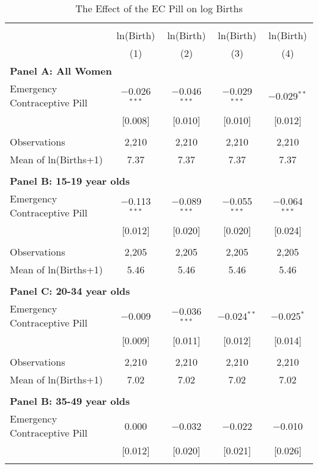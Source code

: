 \begin{table}[!htbp] \centering
\caption{The Effect of the EC Pill on log Births}
\label{TEENtab:aggregateLog}
\begin{tabular}{@{\extracolsep{5pt}}lcccc}
\\[-1.8ex]\hline \hline \\[-1.8ex] 
& ln(Birth) & ln(Birth) & ln(Birth) & ln(Birth) \\
&(1)&(2)&(3)&(4) \\ \hline
\multicolumn{5}{l}{\textbf{
\noindent Panel A: All Women}} \\
Emergency Contraceptive Pill&$-$0.026$^{***}$&$-$0.046$^{***}$&$-$0.029$^{***}$&$-$0.029$^{**}$\\
            &[0.008]&[0.010]&[0.010]&[0.012]\\
 & & & & \\
Observations&2,210&2,210&2,210&2,210\\
Mean of ln(Births+1) &7.37&7.37&7.37&7.37\\
 & & & & \\
\multicolumn{5}{l}{\noindent \textbf{
Panel B: 15-19 year olds}} \\
Emergency Contraceptive Pill&$-$0.113$^{***}$&$-$0.089$^{***}$&$-$0.055$^{***}$&$-$0.064$^{***}$\\
            &[0.012]&[0.020]&[0.020]&[0.024]\\
 & & & & \\
Observations&2,205&2,205&2,205&2,205\\
Mean of ln(Births+1) &5.46&5.46&5.46&5.46\\
 & & & & \\
\multicolumn{5}{l}{\noindent \textbf{
Panel C: 20-34 year olds}} \\
Emergency Contraceptive Pill&$-$0.009&$-$0.036$^{***}$&$-$0.024$^{**}$&$-$0.025$^{*}$\\
            &[0.009]&[0.011]&[0.012]&[0.014]\\
 & & & & \\
Observations&2,210&2,210&2,210&2,210\\
Mean of ln(Births+1) &7.02&7.02&7.02&7.02\\
 & & & & \\
\multicolumn{5}{l}{\noindent \textbf{
Panel B: 35-49 year olds}} \\
Emergency Contraceptive Pill&0.000&$-$0.032&$-$0.022&$-$0.010\\
            &[0.012]&[0.020]&[0.021]&[0.026]\\
 & & & & \\

\end{tabular}
\end{table}
